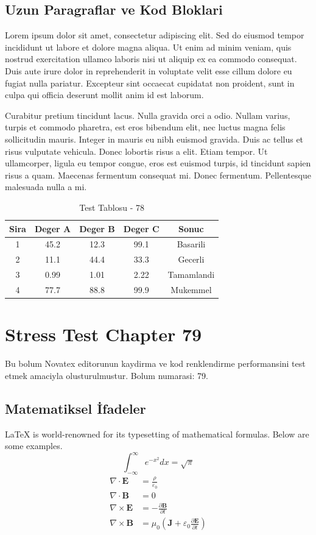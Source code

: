 \documentclass[12pt,a4paper]{article}
\begin{document}
\subsection{Uzun Paragraflar ve Kod Bloklari}
Lorem ipsum dolor sit amet, consectetur adipiscing elit. Sed do eiusmod tempor incididunt ut labore et dolore magna aliqua. Ut enim ad minim veniam, quis nostrud exercitation ullamco laboris nisi ut aliquip ex ea commodo consequat. Duis aute irure dolor in reprehenderit in voluptate velit esse cillum dolore eu fugiat nulla pariatur. Excepteur sint occaecat cupidatat non proident, sunt in culpa qui officia deserunt mollit anim id est laborum.

Curabitur pretium tincidunt lacus. Nulla gravida orci a odio. Nullam varius, turpis et commodo pharetra, est eros bibendum elit, nec luctus magna felis sollicitudin mauris. Integer in mauris eu nibh euismod gravida. Duis ac tellus et risus vulputate vehicula. Donec lobortis risus a elit. Etiam tempor. Ut ullamcorper, ligula eu tempor congue, eros est euismod turpis, id tincidunt sapien risus a quam. Maecenas fermentum consequat mi. Donec fermentum. Pellentesque malesuada nulla a mi.

\begin{table}[h!]
\centering
\begin{tabular}{|c|c|c|c|c|}
\hline
\textbf{Sira} & \textbf{Deger A} & \textbf{Deger B} & \textbf{Deger C} & \textbf{Sonuc} \\
\hline
1 & 45.2 & 12.3 & 99.1 & Basarili \\
2 & 11.1 & 44.4 & 33.3 & Gecerli \\
3 & 0.99 & 1.01 & 2.22 & Tamamlandi \\
4 & 77.7 & 88.8 & 99.9 & Mukemmel \\
\hline
\end{tabular}
\caption{Test Tablosu - 78}
\end{table}

\newpage
\section{Stress Test Chapter 79}
Bu bolum Novatex editorunun kaydirma ve kod renklendirme performansini test etmek amaciyla olusturulmustur. Bolum numarasi: 79.

\subsection{Matematiksel İfadeler}
\LaTeX{} is world-renowned for its typesetting of mathematical formulas. Below are some examples.
\begin{equation}
\int_{-\infty}^{\infty} e^{-x^2} dx = \sqrt{\pi}
\end{equation}
\begin{align}
\nabla \cdot \mathbf{E} &= \frac{\rho}{\varepsilon_0} \\
\nabla \cdot \mathbf{B} &= 0 \\
\nabla \times \mathbf{E} &= -\frac{\partial \mathbf{B}}{\partial t} \\
\nabla \times \mathbf{B} &= \mu_0\left(\mathbf{J} + \varepsilon_0 \frac{\partial \mathbf{E}}{\partial t}\right)
\end{align}
\end{document}
